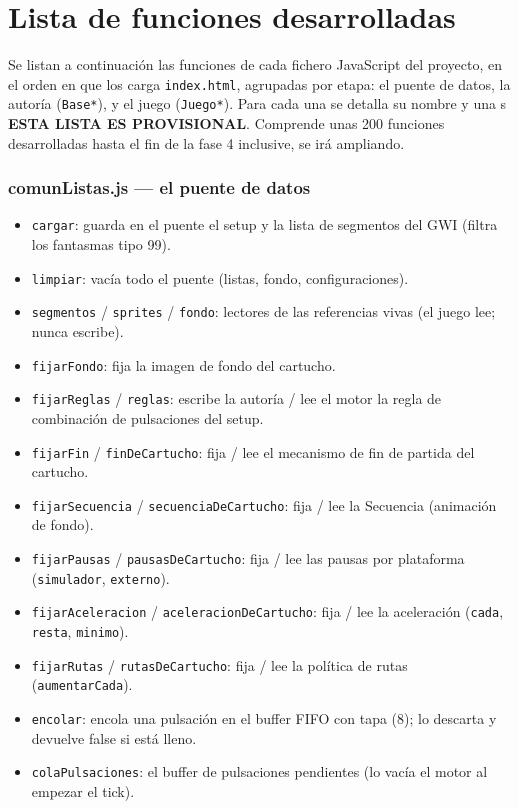 \documentclass[../main.tex]{subfiles}
\begin{document}
\chapter{Lista de funciones desarrolladas}
\label{sec:ListaFuncionesDerarrolladas}
	
Se listan a continuación las funciones de cada fichero JavaScript
del proyecto, en el orden en que los carga \texttt{index.html},
agrupadas por etapa: el puente de datos, la autoría (\texttt{Base*}),
y el juego (\texttt{Juego*}). Para cada una se detalla su nombre y una
s
\textbf{ESTA LISTA ES PROVISIONAL}. Comprende unas 200 funciones desarrolladas hasta el fin de la fase 4 inclusive, se irá ampliando.

\subsection*{comunListas.js — el puente de datos}

\begin{itemize}
	\item \texttt{cargar}: guarda en el puente el setup y la lista de
	segmentos del GWI (filtra los fantasmas tipo 99).
	\item \texttt{limpiar}: vacía todo el puente (listas, fondo,
	configuraciones).
	\item \texttt{segmentos} / \texttt{sprites} / \texttt{fondo}:
	lectores de las referencias vivas (el juego lee; nunca escribe).
	\item \texttt{fijarFondo}: fija la imagen de fondo del cartucho.
	\item \texttt{fijarReglas} / \texttt{reglas}: escribe la autoría /
	lee el motor la regla de combinación de pulsaciones del setup.
	\item \texttt{fijarFin} / \texttt{finDeCartucho}: fija / lee el
	mecanismo de fin de partida del cartucho.
	\item \texttt{fijarSecuencia} / \texttt{secuenciaDeCartucho}: fija /
	lee la Secuencia (animación de fondo).
	\item \texttt{fijarPausas} / \texttt{pausasDeCartucho}: fija / lee
	las pausas por plataforma (\texttt{simulador}, \texttt{externo}).
	\item \texttt{fijarAceleracion} / \texttt{aceleracionDeCartucho}:
	fija / lee la aceleración (\texttt{cada}, \texttt{resta},
	\texttt{minimo}).
	\item \texttt{fijarRutas} / \texttt{rutasDeCartucho}: fija / lee la
	política de rutas (\texttt{aumentarCada}).
	\item \texttt{encolar}: encola una pulsación en el buffer FIFO con
	tapa (8); lo descarta y devuelve false si está lleno.
	\item \texttt{colaPulsaciones}: el buffer de pulsaciones pendientes
	(lo vacía el motor al empezar el tick).
\end{itemize}
\end{document}
